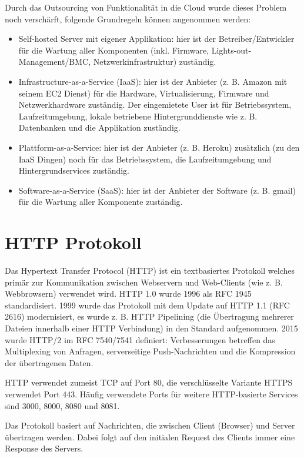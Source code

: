 Durch das Outsourcing von Funktionalität in die Cloud wurde dieses Problem noch verschärft, folgende Grundregeln können angenommen werden:

\begin{itemize}
	\item Self-hosted Server mit eigener Applikation: hier ist der Betreiber/Entwickler für die Wartung aller Komponenten (inkl. Firmware, Lights-out-Management/BMC, Netzwerkinfrastruktur) zuständig.
	\item Infrastructure-as-a-Service (IaaS): hier ist der Anbieter (z. B. Amazon mit seinem EC2 Dienst) für die Hardware, Virtualisierung, Firmware und Netzwerkhardware zuständig. Der eingemietete User ist für Betriebssystem, Laufzeitumgebung, lokale betriebene Hintergrunddienste wie z. B. Datenbanken und die Applikation zuständig.
	\item Plattform-as-a-Service: hier ist der Anbieter (z. B. Heroku) zusätzlich (zu den IaaS Dingen) noch für das Betriebssystem, die Laufzeitumgebung und Hintergrundservices zuständig.
	\item Software-as-a-Service (SaaS): hier ist der Anbieter der Software (z. B. gmail) für die Wartung aller Komponente zuständig.
\end{itemize}

\section{HTTP Protokoll}

Das Hypertext Transfer Protocol (HTTP) ist ein textbasiertes Protokoll welches primär zur Kommunikation zwischen Webservern und Web-Clients (wie z. B. Webbrowsern) verwendet wird. HTTP 1.0 wurde 1996 als RFC 1945 standardisiert. 1999 wurde das Protokoll mit dem Update auf HTTP 1.1 (RFC 2616) modernisiert, es wurde z. B. HTTP Pipelining (die Übertragung mehrerer Dateien innerhalb einer HTTP Verbindung) in den Standard aufgenommen. 2015 wurde HTTP/2 im RFC 7540/7541 definiert: Verbesserungen betreffen das Multiplexing von Anfragen, serverseitige Push-Nachrichten und die Kompression der übertragenen Daten.

HTTP verwendet zumeist TCP auf Port 80, die verschlüsselte Variante HTTPS verwendet Port 443. Häufig verwendete Ports für weitere HTTP-basierte Services sind 3000, 8000, 8080 und 8081.

Das Protokoll basiert auf Nachrichten, die zwischen Client (Browser) und Server übertragen werden. Dabei folgt auf den initialen Request des Clients immer eine Response des Servers.

